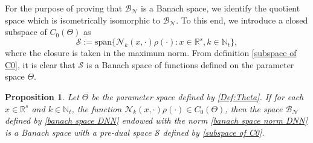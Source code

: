 \documentclass[11pt]{article}
\newtheorem{proposition}[theorem]{Proposition}
\begin{document}
For the purpose of proving that  $\mathcal{B}_{\mathcal{N}}$ is a Banach space, we identify the quotient space which is isometrically isomorphic to $\mathcal{B}_{\mathcal{N}}$. To this end, we introduce a closed subspace of $C_0(\Theta)$ as 
\begin{equation}\label{subspace of C0}
\mathcal{S}:=\overline{\mathrm{span}}\{\mathcal{N}_k({x},\cdot)\rho(\cdot): {x}\in\mathbb{R}^s,k\in\mathbb{N}_t\},
\end{equation}
where the closure is taken in the maximum norm. From definition \eqref{subspace of C0}, it is clear that $\mathcal{S}$ is a Banach space of functions defined on the parameter space $\Theta$.

\begin{proposition}\label{prop: BN is isometic isomorphic to quotient space}
Let $\Theta$ be the parameter space defined by \eqref{Def:Theta}. If 
for each $x\in \mathbb{R}^s$ and $k\in\mathbb{N}_t$, the function $\mathcal{N}_k({x},\cdot)\rho(\cdot)\in C_0(\Theta)$, then the space $\mathcal{B}_{\mathcal{N}}$ defined by \eqref{banach space DNN} endowed with the norm \eqref{banach space norm DNN} is a Banach space with a pre-dual space $\mathcal{S}$ defined by \eqref{subspace of C0}.
\end{proposition}
\end{document}
